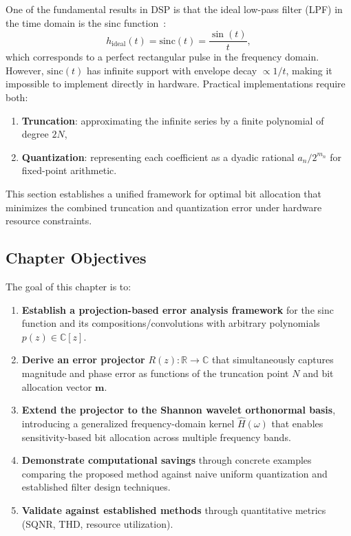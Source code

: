 One of the fundamental results in DSP is that the ideal low-pass filter (LPF) in the time domain is the sinc function~\cite{OppenheimDSP}:
\[
h_{\text{ideal}}(t) = \mathrm{sinc}(t) = \frac{\sin(t)}{t},
\]
which corresponds to a perfect rectangular pulse in the frequency domain. However, $\mathrm{sinc}(t)$ has infinite support with envelope decay $\propto 1/t$, making it impossible to implement directly in hardware. Practical implementations require both:
\begin{enumerate}
\item \textbf{Truncation}: approximating the infinite series by a finite polynomial of degree $2N$,
\item \textbf{Quantization}: representing each coefficient as a dyadic rational $a_n/2^{m_n}$ for fixed-point arithmetic.
\end{enumerate}

This section establishes a unified framework for optimal bit allocation that minimizes the combined truncation and quantization error under hardware resource constraints.

\subsection{Chapter Objectives}

The goal of this chapter is to:

\begin{enumerate}
\item \textbf{Establish a projection-based error analysis framework} for the sinc function and its compositions/convolutions with arbitrary polynomials $p(z) \in \mathbb{C}[z]$.

\item \textbf{Derive an error projector} $R(z): \mathbb{R} \to \mathbb{C}$ that simultaneously captures magnitude and phase error as functions of the truncation point $N$ and bit allocation vector $\mathbf{m}$.

\item \textbf{Extend the projector to the Shannon wavelet orthonormal basis}, introducing a generalized frequency-domain kernel $\widehat{H}(\omega)$ that enables sensitivity-based bit allocation across multiple frequency bands.

\item \textbf{Demonstrate computational savings} through concrete examples comparing the proposed method against naive uniform quantization and established filter design techniques.

\item \textbf{Validate against established methods} through quantitative metrics (SQNR, THD, resource utilization).
\end{enumerate}

